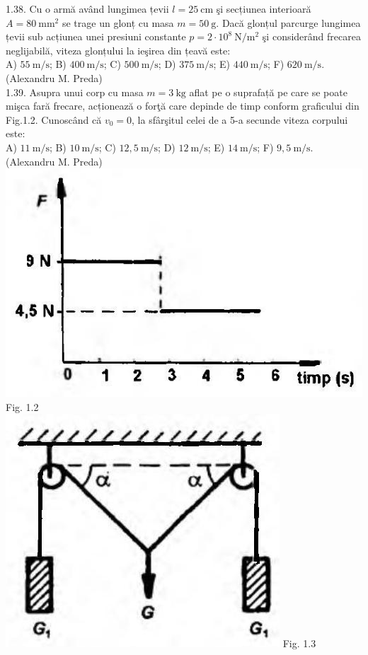 1.38. Cu o armă având lungimea țevii $l=25 \mathrm{~cm}$ şi secțiunea interioară $A=80 \mathrm{~mm}^{2}$ se trage un glonț cu masa $m=50 \mathrm{~g}$. Dacă glonțul parcurge lungimea țevii sub acțiunea unei presiuni constante $p=2 \cdot 10^{8} \mathrm{~N} / \mathrm{m}^{2}$ şi considerând frecarea neglijabilă, viteza glonțului la ieşirea din țeavă este:\\ A) $55 \mathrm{~m} / \mathrm{s}$; B) $400 \mathrm{~m} / \mathrm{s}$; C) $500 \mathrm{~m} / \mathrm{s}$; D) $375 \mathrm{~m} / \mathrm{s}$; E) $440 \mathrm{~m} / \mathrm{s}$; F) $620 \mathrm{~m} / \mathrm{s}$.\\ (Alexandru M. Preda)\\

1.39. Asupra unui corp cu masa $m=3 \mathrm{~kg}$ aflat pe o suprafață pe care se poate mişca fară frecare, acționează o forţă care depinde de timp conform graficului din Fig.1.2. Cunoscând că $v_{0}=0$, la sfârşitul celei de a 5-a secunde viteza corpului este:\\ A) $11 \mathrm{~m} / \mathrm{s}$; B) $10 \mathrm{~m} / \mathrm{s}$; C) $12,5 \mathrm{~m} / \mathrm{s}$; D) $12 \mathrm{~m} / \mathrm{s}$; E) $14 \mathrm{~m} / \mathrm{s}$; F) $9,5 \mathrm{~m} / \mathrm{s}$.\\ (Alexandru M. Preda)\\ \includegraphics[width=0.4\linewidth]{images/2025_07_01_5b3ff9fa0d508c8e9f17g-010(1)} Fig. 1.2\\ \includegraphics[width=0.4\linewidth]{images/2025_07_01_5b3ff9fa0d508c8e9f17g-010} Fig. 1.3\\

